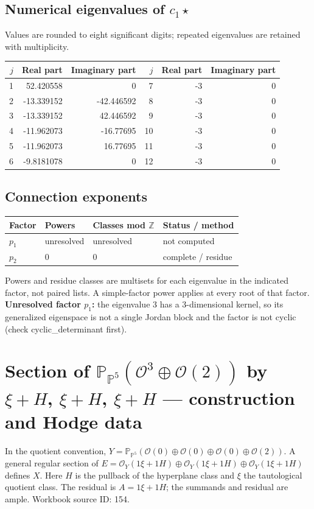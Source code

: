 \documentclass[10pt,a4paper]{article}
\begin{document}
\subsection*{Numerical eigenvalues of $c_1\star$}
Values are rounded to eight significant digits; repeated eigenvalues are retained with multiplicity.
\begin{center}\small\begin{tabular}{rrr@{\qquad}rrr}\toprule $j$ & Real part & Imaginary part & $j$ & Real part & Imaginary part\\\midrule
1 & 52.420558 & 0 & 7 & -3 & 0\\
2 & -13.339152 & -42.446592 & 8 & -3 & 0\\
3 & -13.339152 & 42.446592 & 9 & -3 & 0\\
4 & -11.962073 & -16.77695 & 10 & -3 & 0\\
5 & -11.962073 & 16.77695 & 11 & -3 & 0\\
6 & -9.8181078 & 0 & 12 & -3 & 0\\
\bottomrule\end{tabular}\end{center}
\subsection*{Connection exponents}
\begin{center}\begin{tabular}{llll}\toprule Factor & Powers & Classes mod $\mathbb Z$ & Status / method\\\midrule
$p_{1}$ & unresolved & unresolved & not computed\\
$p_{2}$ & $0$ & $0$ & complete / residue\\
\bottomrule\end{tabular}\end{center}
Powers and residue classes are multisets for each eigenvalue in the indicated factor, not paired lists. A simple-factor power applies at every root of that factor.
\textbf{Unresolved factor $p_{1}$:} the eigenvalue 3 has a 3-dimensional kernel, so its generalized eigenspace is not a single Jordan block and the factor is not cyclic (check cyclic\_determinant first).
\clearpage\section*{Section of $\mathbb P_{\mathbb P^{5}}(\mathcal O^{3}\oplus \mathcal O(2))$ by $\xi +H$, $\xi +H$, $\xi +H$ --- construction and Hodge data}\label{entry:PB5-154}
In the quotient convention, $Y=\mathbb P_{\mathbb P^{5}}(\mathcal O(0)\oplus\mathcal O(0)\oplus\mathcal O(0)\oplus\mathcal O(2))$.
A general regular section of $E=\mathcal O_Y(1\xi+1H)\oplus\mathcal O_Y(1\xi+1H)\oplus\mathcal O_Y(1\xi+1H)$ defines $X$.
Here $H$ is the pullback of the hyperplane class and $\xi$ the tautological quotient class. The residual is $A=1\xi+1H$; the summands and residual are ample.
Workbook source ID: 154.
\end{document}
